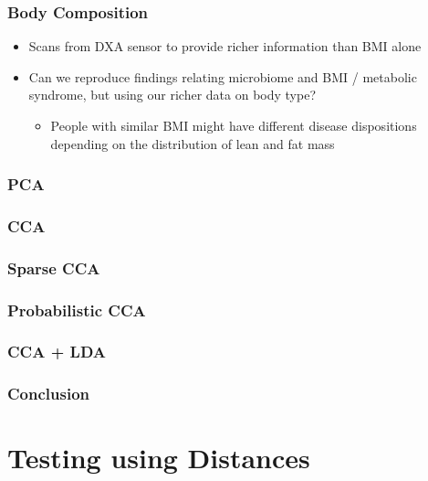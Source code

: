 \documentclass{beamer}
\begin{document}
\begin{frame}
  \frametitle{Body Composition}
  \begin{itemize}
  \item Scans from DXA sensor to provide richer information than BMI alone
  \item Can we reproduce findings relating microbiome and BMI / metabolic
    syndrome, but using our richer data on body type?
    \begin{itemize}
    \item People with similar BMI might have different disease dispositions
      depending on the distribution of lean and fat mass
    \end{itemize}
  \end{itemize}  
\end{frame}

\begin{frame}
  \frametitle{PCA}
  
\end{frame}

\begin{frame}
  \frametitle{CCA}
\end{frame}

\begin{frame}
  \frametitle{Sparse CCA}
\end{frame}

\begin{frame}
  \frametitle{Probabilistic CCA}
\end{frame}

\begin{frame}
  \frametitle{CCA + LDA}
\end{frame}

\begin{frame}
  \frametitle{Conclusion}
  
\end{frame}



\section{Testing using Distances}
\label{sec:testing_distances}
\end{document}
